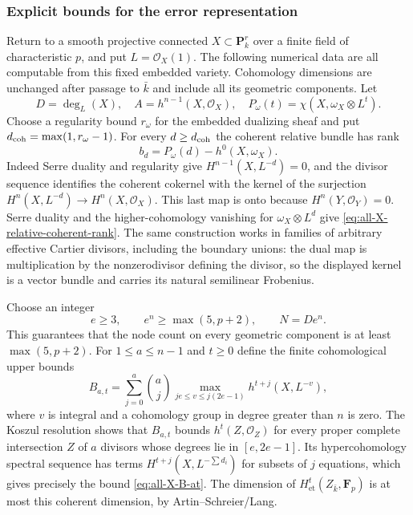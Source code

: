 \subsubsection{Explicit bounds for the error representation}

Return to a smooth projective connected
$X\subset\mathbf P^r_k$ over a finite field of characteristic
$p$, and put $L=\mathcal O_X(1)$.
The following numerical data are all computable from this
fixed embedded variety.  Cohomology dimensions are unchanged
after passage to $\bar k$ and include all its geometric
components.
Let
\[
 D=\deg_L(X),\quad A=h^{n-1}(X,\mathcal O_X),\quad
 P_\omega(t)=\chi(X,\omega_X\otimes L^t).
\]
Choose a regularity bound $r_\omega$ for the embedded
dualizing sheaf and put $d_{\rm coh}=\max(1,r_\omega-1)$.
For every $d\geq d_{\rm coh}$ the coherent relative bundle
has rank
\begin{equation}\label{eq:all-X-relative-coherent-rank}
 b_d=P_\omega(d)-h^0(X,\omega_X).
\end{equation}
Indeed Serre duality and regularity give
$H^{n-1}(X,L^{-d})=0$, and the divisor sequence identifies
the coherent cokernel with the kernel of the surjection
$H^n(X,L^{-d})\to H^n(X,\mathcal O_X)$.
This last map is onto because $H^n(Y,\mathcal O_Y)=0$.
Serre duality and the higher-cohomology vanishing for
$\omega_X\otimes L^d$ give \eqref{eq:all-X-relative-coherent-rank}.
The same construction works in families of arbitrary
effective Cartier divisors, including the boundary unions:
the dual map is multiplication by the nonzerodivisor
defining the divisor, so the displayed kernel is a vector
bundle and carries its natural semilinear Frobenius.

Choose an integer
\[
 e\geq3,\qquad e^n\geq\max(5,p+2),
 \qquad N=De^n .
 \tag{9}
\]
This guarantees that the node count on every geometric
component is at least $\max(5,p+2)$.
For $1\leq a\leq n-1$ and $t\geq0$ define the finite
cohomological upper bounds
\begin{equation}\label{eq:all-X-B-at}
 B_{a,t}=
 \sum_{j=0}^a\binom aj
 \max_{je\leq v\leq j(2e-1)}
       h^{t+j}(X,L^{-v}),
\end{equation}
where $v$ is integral and a cohomology group in degree
greater than $n$ is zero.
The Koszul resolution shows that $B_{a,t}$ bounds
$h^t(Z,\mathcal O_Z)$ for every proper complete intersection
$Z$ of $a$ divisors whose degrees lie in $[e,2e-1]$.
Its hypercohomology spectral sequence has terms
$H^{t+j}(X,L^{-\sum d_i})$ for subsets of $j$ equations,
which gives precisely the bound
\eqref{eq:all-X-B-at}.  The dimension of
$H^t_{\mathrm{et}}(Z_{\bar k},\mathbf F_p)$ is at most this
coherent dimension, by Artin--Schreier/Lang.

